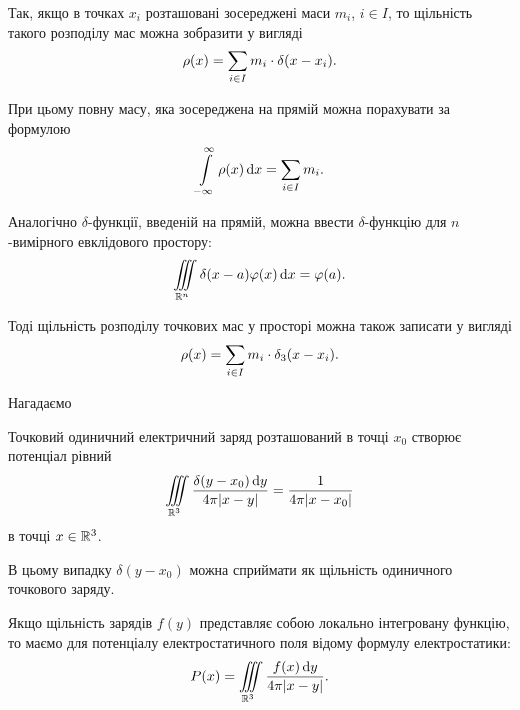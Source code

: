 \begin{example}
	Так, якщо в точках $x_i$ розташовані зосереджені маси $m_i$, $i \in I$, то
	щільність такого розподілу мас можна зобразити у вигляді
	\begin{equation}
		\rho(x) = \displaystyle\sum\limits_{i \in I} m_i \cdot \delta(x - x_i).	
	\end{equation}
\end{example}

\begin{remark}
	При цьому повну масу, яка зосереджена на прямій можна порахувати за формулою
	\begin{equation}
		\displaystyle\int\limits_{-\infty}^\infty \rho(x) \mathop{}\!\mathrm{d} x = \displaystyle\sum\limits_{i \in I} m_i.	
	\end{equation}
\end{remark}

\begin{definition}
	Аналогічно $\delta$-функції, введеній на прямій, можна ввести $\delta$-функцію для $n$-вимірного евклідового простору:
	\begin{equation}
		\displaystyle\iiint\limits_{\mathbb{R}^n} \delta(x - a) \varphi(x) \mathop{}\!\mathrm{d} x = \varphi(a).
	\end{equation}
\end{definition}

\begin{remark}
	Тоді щільність розподілу точкових мас у просторі можна також записати у вигляді
	\begin{equation}
		\rho(x) = \displaystyle\sum\limits_{i \in I} m_i \cdot \delta_3(x - x_i).	
	\end{equation}
\end{remark}

Нагадаємо
\begin{proposition}
	Точковий одиничний електричний заряд розташований в точці $x_0$ створює потенціал рівний
	\begin{equation}
		\displaystyle\iiint\limits_{\mathbb{R}^3} \frac{\delta(y - x_0) \mathop{}\!\mathrm{d} y}{4 \pi |x - y|} = \frac{1}{4 \pi |x - x_0|}
	\end{equation}
	в точці $x \in \mathbb{R}^3$. 
\end{proposition}

\begin{remark}
	В цьому випадку $\delta(y - x_0)$ можна сприймати як щільність одиничного точкового заряду.
\end{remark}

\begin{example}
	Якщо щільність зарядів $f(y)$ представляє собою локально інтегровану функцію, то маємо для потенціалу електростатичного поля відому формулу електростатики:
	\begin{equation}
		P(x) = \displaystyle\iiint\limits_{\mathbb{R}^3} \frac{f(x) \mathop{}\!\mathrm{d} y}{4 \pi |x - y|}.	
	\end{equation}
\end{example}

